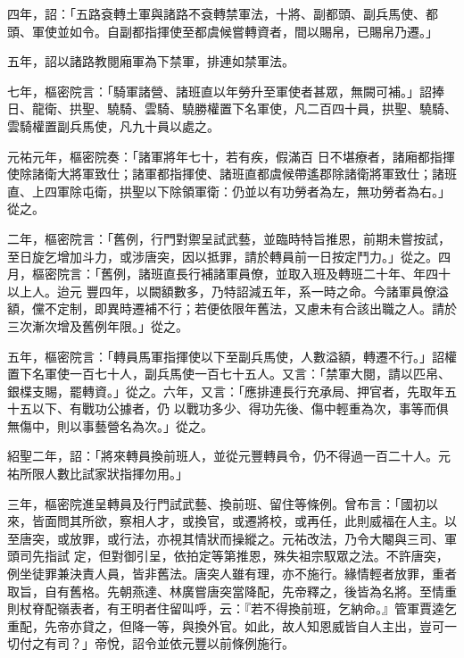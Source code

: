 \begin{pinyinscope}
 四年，詔：「五路袞轉土軍與諸路不袞轉禁軍法，十將、副都頭、副兵馬使、都頭、軍使並如令。自副都指揮使至都虞候嘗轉資者，間以賜帛，已賜帛乃遷。」



 五年，詔以諸路教閱廂軍為下禁軍，排連如禁軍法。



 七年，樞密院言：「騎軍諸營、諸班直以年勞升至軍使者甚眾，無闕可補。」詔捧日、龍衛、拱聖、驍騎、雲騎、驍勝權置下名軍使，凡二百四十員，拱聖、驍騎、雲騎權置副兵馬使，凡九十員以處之。



 元祐元年，樞密院奏：「諸軍將年七十，若有疾，假滿百
 日不堪療者，諸廂都指揮使除諸衛大將軍致仕；諸軍都指揮使、諸班直都虞候帶遙郡除諸衛將軍致仕；諸班直、上四軍除屯衛，拱聖以下除領軍衛：仍並以有功勞者為左，無功勞者為右。」從之。



 二年，樞密院言：「舊例，行門對禦呈試武藝，並臨時特旨推恩，前期未嘗按試，至日旋乞增加斗力，或涉唐突，因以抵罪，請於轉員前一日按定鬥力。」從之。四月，樞密院言：「舊例，諸班直長行補諸軍員僚，並取入班及轉班二十年、年四十以上人。迨元
 豐四年，以闕額數多，乃特詔減五年，系一時之命。今諸軍員僚溢額，儻不定制，即異時遷補不行；若便依限年舊法，又慮未有合該出職之人。請於三次漸次增及舊例年限。」從之。



 五年，樞密院言：「轉員馬軍指揮使以下至副兵馬使，人數溢額，轉遷不行。」詔權置下名軍使一百七十人，副兵馬使一百七十五人。又言：「禁軍大閱，請以匹帛、銀楪支賜，罷轉資。」從之。六年，又言：「應排連長行充承局、押官者，先取年五十五以下、有戰功公據者，仍
 以戰功多少、得功先後、傷中輕重為次，事等而俱無傷中，則以事藝營名為次。」從之。



 紹聖二年，詔：「將來轉員換前班人，並從元豐轉員令，仍不得過一百二十人。元祐所限人數比試家狀指揮勿用。」



 三年，樞密院進呈轉員及行門試武藝、換前班、留住等條例。曾布言：「國初以來，皆面問其所欲，察相人才，或換官，或遷將校，或再任，此則威福在人主。以至唐突，或放罪，或行法，亦視其情狀而操縱之。元祐改法，乃令大閹與三司、軍頭司先指試
 定，但對御引呈，依拍定等第推恩，殊失祖宗馭眾之法。不許唐突，例坐徒罪兼決責人員，皆非舊法。唐突人雖有理，亦不施行。緣情輕者放罪，重者取旨，自有舊格。先朝燕達、林廣嘗唐突當降配，先帝釋之，後皆為名將。至情重則杖脊配嶺表者，有王明者住留叫呼，云：『若不得換前班，乞納命。』管軍賈逵乞重配，先帝亦貸之，但降一等，與換外官。如此，故人知恩威皆自人主出，豈可一切付之有司？」帝悅，詔令並依元豐以前條例施行。




\end{pinyinscope}
